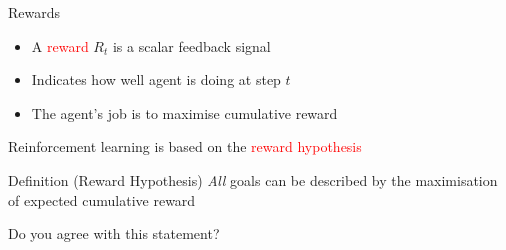 \begin{frame}{Rewards}
\begin{itemize}
  \item A \textcolor{red}{reward} $R_t$ is a scalar feedback signal
  \item Indicates how well agent is doing at step $t$
  \item The agent's job is to maximise cumulative reward
\end{itemize}
Reinforcement learning is based on the \textcolor{red}{reward hypothesis}
\begin{block}{Definition (Reward Hypothesis)}
\emph{All} goals can be described by the maximisation of expected cumulative reward
\end{block}
Do you agree with this statement?
\end{frame}

